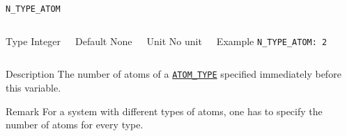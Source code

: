 \documentclass[xcolor=dvipsnames,t]{beamer}
\begin{document}
\begin{frame}[allowframebreaks]{\texttt{N\_TYPE\_ATOM}} \label{N_TYPE_ATOM}
\vspace*{-12pt}
\begin{columns}
\begin{block}{Type}
Integer
\end{block}

\begin{block}{Default}
None
\end{block}

\begin{block}{Unit}
No unit
\end{block}

\begin{block}{Example}
\texttt{N\_TYPE\_ATOM: 2}  
\end{block}
\end{columns}

\begin{block}{Description}
The number of atoms of a \hyperlink{ATOM_TYPE}{\texttt{ATOM\_TYPE}} specified immediately before this variable.
\end{block}

\begin{block}{Remark}
For a system with different types of atoms, one has to specify the number of atoms for every type.
\end{block}

\end{frame}
\end{document}
